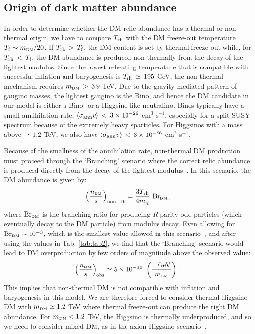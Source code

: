 \documentclass[11pt,a4paper]{article}
\newcommand{\be}{\begin{equation}}
\newcommand{\ee}{\end{equation}}
\def\DM{{\scriptscriptstyle \rm DM}}
\begin{document}
\subsection{Origin of dark matter abundance}

In order to determine whether the DM relic abundance has a thermal or non-thermal origin, we have to compare $T_{\rm rh}$ with the DM freeze-out temperature $T_{\rm f} \sim m_\DM/20$. If $T_{\rm rh} \, > \, T_{\rm f}$, the DM content is set by thermal freeze-out while, for $T_{\rm rh} \, < \, T_{\rm f}$, the DM abundance is produced non-thermally from the decay of the lightest modulus. Since the lowest reheating temperature that is compatible with successful inflation and baryogenesis is $T_{\rm rh} \, \simeq \, 195$ GeV, the non-thermal mechanism requires $m_\DM \, > \, 3.9$ TeV. Due to the gravity-mediated pattern of gaugino masses, the lightest gaugino is the Bino, and hence the DM candidate in our model is either a Bino- or a Higgsino-like neutralino. Binos typically have a small annihilation rate, $\langle \sigma_{\rm ann} v \rangle \, < \, 3 \times 10^{-26}$ cm$^3$ s$^{-1}$, especially for a split SUSY spectrum because of the extremely heavy sparticles. For Higgsinos with a mass above $\simeq 1.2$ TeV, we also have $\langle \sigma_{\rm ann} v \rangle \, < \, 3 \times 10^{-26}$ cm$^3$ s$^{-1}$.

Because of the smallness of the annihilation rate, non-thermal DM production must proceed through the `Branching' scenario where the correct relic abundance is produced directly from the decay of the lightest modulus~\cite{NonThDMinSeqLVS}. In this scenario, the DM abundance is given by:
\be \label{prodabun}
\left({n_\DM \over s}\right)_{\rm non-th} = {3 T_{\rm rh} \over 4 m_\chi} ~ {\rm Br}_\DM \,,
\ee
where ${\rm Br}_\DM$ is the branching ratio for producing $R$-parity odd particles (which eventually decay to the DM particle) from modulus decay. Even allowing for ${\rm Br}_\DM \sim 10^{-3}$, which is the smallest value allowed in this scenario~\cite{ADS}, and after using the values in Tab. \ref{tab:tab2}, we find that the `Branching' scenario would lead to DM overproduction by few orders of magnitude above the observed value: 
\be \label{obsabun}
\left({n_\DM \over s}\right)_{\rm obs} \simeq 5 \times 10^{-10} ~ \left({1 ~ {\rm GeV} \over m_\DM}\right)\,.
\ee
This implies that non-thermal DM is not compatible with inflation and baryogenesis in this model. We are therefore forced to consider thermal Higgsino DM with $m_\DM \simeq 1.2$ TeV where thermal freeze-out can produce the right DM abundance. For $m_\DM < 1.2$ TeV, the Higgsino is thermally underproduced, and so we need to consider mixed DM, as in the axion-Higgsino scenario~\cite{Howie}.                
\end{document}
